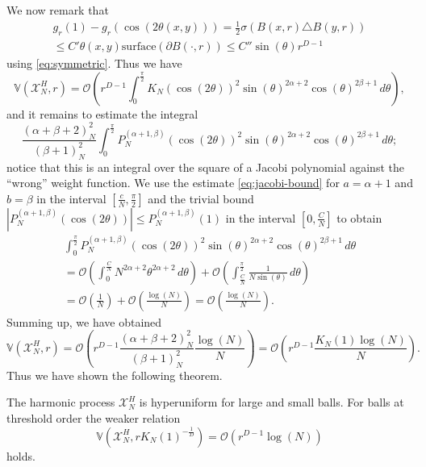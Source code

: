We now remark that
\begin{multline*}
  g_r(1)-g_r(\cos(2\theta(x,y)))=\frac12\sigma(B(x,r)\triangle B(y,r))\\\leq
  C'\theta(x,y)\mathrm{surface}(\partial B(\cdot,r))\leq C''\sin(\theta)r^{D-1}
\end{multline*}
using \eqref{eq:symmetric}. Thus we have
\begin{equation*}
  \mathbb{V}(\mathscr{X}_N^H,r)=\mathcal{O}\left(r^{D-1}\int_0^{\frac\pi2}
  K_N(\cos(2\theta))^2
  \sin(\theta)^{2\alpha+2}\cos(\theta)^{2\beta+1}\,d\theta\right),
\end{equation*}
and it remains to estimate the integral
\begin{equation*}
  \frac{(\alpha+\beta+2)_N^2}{(\beta+1)_N^2}\int_0^{\frac\pi2}
  P_N^{(\alpha+1,\beta)}(\cos(2\theta))^2\sin(\theta)^{2\alpha+2}
  \cos(\theta)^{2\beta+1}\,d\theta;
\end{equation*}
notice that this is an integral over the square of a Jacobi polynomial against
the ``wrong'' weight function. We use the estimate \eqref{eq:jacobi-bound} for
$a=\alpha+1$ and $b=\beta$ in
the interval $[\frac cN,\frac\pi2]$ and the trivial bound
$|P_N^{(\alpha+1,\beta)}(\cos(2\theta))|\leq P_N^{(\alpha+1,\beta)}(1)$ in the
interval $[0,\frac CN]$ to obtain
\begin{multline*}
  \int_0^{\frac\pi2}
  P_N^{(\alpha+1,\beta)}(\cos(2\theta))^2\sin(\theta)^{2\alpha+2}
  \cos(\theta)^{2\beta+1}\,d\theta\\=
  \mathcal{O}\left(\int_0^{\frac CN}N^{2\alpha+2}\theta^{2\alpha+2}
    \,d\theta\right)+
\mathcal{O}\left(\int_{\frac
    CN}^{\frac\pi2}\frac1{N\sin(\theta)}\,d\theta\right)\\=
\mathcal{O}\left(\frac1N\right)+\mathcal{O}\left(\frac{\log(N)}N\right)=
\mathcal{O}\left(\frac{\log(N)}N\right).
\end{multline*}
Summing up, we have obtained
\begin{equation*}
  \mathbb{V}(\mathscr{X}_N^H,r)=
  \mathcal{O}\left(r^{D-1}\frac{(\alpha+\beta+2)_N^2}{(\beta+1)_N^2}
    \frac{\log(N)}N\right)=\mathcal{O}\left(r^{D-1}\frac{K_N(1)\log(N)}N\right).
\end{equation*}
Thus we have shown the following theorem.
\begin{theorem}
  The harmonic process $\mathscr{X}_N^H$ is hyperuniform for large and small
  balls. For balls at threshold order the weaker relation
  \begin{equation*}
    \mathbb{V}(\mathscr{X}_N^H,rK_N(1)^{-\frac1D})
    =\mathcal{O}\left(r^{D-1}\log(N)\right)
  \end{equation*}
  holds.
\end{theorem}
